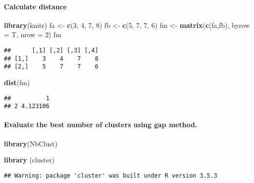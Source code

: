 \documentclass[]{article}
\newenvironment{Shaded}{\begin{snugshade}}{\end{snugshade}}
\newcommand{\KeywordTok}[1]{\textcolor[rgb]{0.13,0.29,0.53}{\textbf{#1}}}
\newcommand{\DataTypeTok}[1]{\textcolor[rgb]{0.13,0.29,0.53}{#1}}
\newcommand{\DecValTok}[1]{\textcolor[rgb]{0.00,0.00,0.81}{#1}}
\newcommand{\StringTok}[1]{\textcolor[rgb]{0.31,0.60,0.02}{#1}}
\newcommand{\NormalTok}[1]{#1}
\let\oldparagraph\paragraph
\renewcommand{\paragraph}[1]{\oldparagraph{#1}\mbox{}}
\begin{document}
\paragraph{Calculate distance}\label{calculate-distance}

\begin{Shaded}
\begin{Highlighting}[]
\KeywordTok{library}\NormalTok{(knitr)}
\NormalTok{fa <-}\StringTok{ }\KeywordTok{c}\NormalTok{(}\DecValTok{3}\NormalTok{, }\DecValTok{4}\NormalTok{, }\DecValTok{7}\NormalTok{, }\DecValTok{8}\NormalTok{)}
\NormalTok{fb <-}\StringTok{ }\KeywordTok{c}\NormalTok{(}\DecValTok{5}\NormalTok{, }\DecValTok{7}\NormalTok{, }\DecValTok{7}\NormalTok{, }\DecValTok{6}\NormalTok{)}
\NormalTok{fm <-}\StringTok{ }\KeywordTok{matrix}\NormalTok{(}\KeywordTok{c}\NormalTok{(fa,fb), }\DataTypeTok{byrow =}\NormalTok{ T, }\DataTypeTok{nrow =} \DecValTok{2}\NormalTok{)}
\NormalTok{fm}
\end{Highlighting}
\end{Shaded}

\begin{verbatim}
##      [,1] [,2] [,3] [,4]
## [1,]    3    4    7    8
## [2,]    5    7    7    6
\end{verbatim}

\begin{Shaded}
\begin{Highlighting}[]
\KeywordTok{dist}\NormalTok{(fm)}
\end{Highlighting}
\end{Shaded}

\begin{verbatim}
##          1
## 2 4.123106
\end{verbatim}

\paragraph{Evaluate the best number of clusters using gap
method.}\label{evaluate-the-best-number-of-clusters-using-gap-method.}

\begin{Shaded}
\begin{Highlighting}[]
\KeywordTok{library}\NormalTok{(NbClust)}
          
\KeywordTok{library}\NormalTok{ (cluster)}
\end{Highlighting}
\end{Shaded}

\begin{verbatim}
## Warning: package 'cluster' was built under R version 3.5.3
\end{verbatim}
\end{document}
